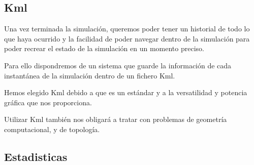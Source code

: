 \subsection*{Kml}

Una vez terminada la simulación, queremos poder tener un historial de todo lo
que haya ocurrido y la facilidad de poder navegar dentro de la simulación para
poder recrear el estado de la simulación en un momento preciso.

Para ello dispondremos de un sistema que guarde la información de cada
instantánea de la simulación dentro de un fichero Kml.

Hemos elegido Kml debido a que es un estándar y a la versatilidad y potencia
gráfica que nos proporciona.

Utilizar Kml también nos obligará a tratar con problemas de geometría
computacional, y de topología. 

\subsection*{Estadisticas}

